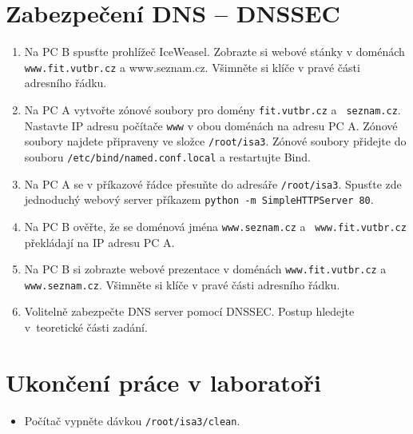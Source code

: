 \begin{enumerate}
\end{enumerate}

\section{Zabezpečení DNS -- DNSSEC}

\begin{enumerate}
  \item Na PC B spusťte prohlížeč IceWeasel. Zobrazte si webové stánky v
    doménách {\tt www.fit.vutbr.cz} a {www.seznam.cz}. Všimněte si klíče v pravé
    části adresního řádku.

  \item Na PC A vytvořte zónové soubory pro domény {\tt fit.vutbr.cz} a {\tt
    seznam.cz}. Nastavte IP adresu počítače {\tt www} v obou doménách na adresu
    PC A. Zónové soubory najdete připraveny ve složce {\tt /root/isa3}. Zónové
    soubory přidejte do souboru {\tt /etc/bind/named.conf.local} a restartujte
    Bind.

  \item Na PC A se v příkazové řádce přesuňte do adresáře {\tt /root/isa3}.
    Spusťte zde jednoduchý webový server příkazem {\tt python -m
    SimpleHTTPServer 80}.

  \item Na PC B ověřte, že se doménová jména {\tt www.seznam.cz} a {\tt
    www.fit.vutbr.cz} překládají na IP adresu PC A.

  \item Na PC B si zobrazte webové prezentace v doménách {\tt www.fit.vutbr.cz}
    a {\tt www.seznam.cz}. Všimněte si klíče v pravé části adresního řádku.

  \item Volitelně zabezpečte DNS server pomocí DNSSEC. Postup hledejte
    v~teoretické části zadání.

\end{enumerate}

\section{Ukončení práce v laboratoři}
\begin{itemize}
  \item Počítač vypněte dávkou {\tt /root/isa3/clean}.
\end{itemize}
